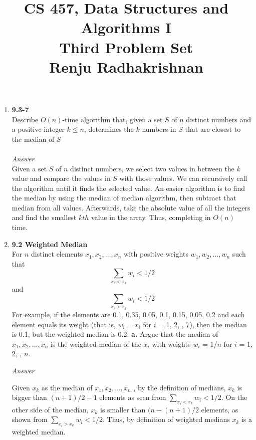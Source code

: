 \documentclass{article}
\begin{document}
\title{CS 457, Data Structures and Algorithms I\\
Third Problem Set\\
Renju Radhakrishnan}
\maketitle
\begin{center}
\end{center}

\begin{enumerate}
\item \textbf{9.3-7}\\
Describe $O(n)$-time algorithm that, given a set $S$ of $n$ distinct numbers and a positive integer $k\leq n$, determines the $k$ numbers in $S$ that are closest to the median of $S$ \\ \\
{\textit{Answer}} \\
Given a set $S$ of $n$ distinct numbers, we select two values in between the $k$ value and compare the values in $S$ with those values. We can recursively call the algorithm until it finds the selected value. An easier algorithm is to find the median by using the median of median algorithm, then subtract that median from all values. Afterwards, take the absolute value of all the integers and find the smallest $kth$ value in the array. Thus, completing in $O(n)$ time.
\newpage
\item \textbf{9.2 Weighted Median}\\
For $n$ distinct elements $x_1, x_2, \dotso, x_n$ with positive weights $w_1, w_2, \dotso, w_n$ such that $$\sum_{x_i < x_k} w_i < 1/2$$ and $$\sum_{x_i > x_k} w_i < 1/2$$
For example, if the elements are 0.1, 0.35, 0.05, 0.1, 0.15, 0.05, 0.2 and each element equals its weight (that is, $w_i = x_i$ for $i$ = 1, 2, \dotso, 7), then the median is 0.1, but the weighted median is 0.2.
\subitem \textbf{a.} Argue that the median of $x_1, x_2, \dotso, x_n$ is the weighted median of the $x_i$ with weights $w_i$ = 1/$n$ for $i$ = 1, 2, \dotso, $n$. 

{\textit{Answer}}

Given $x_k$ as the median of $x_1, x_2, \dotso, x_n$ , by the definition of medians, $x_k$ is bigger than $(n + 1)/2 - 1$ elements as seen from $\sum_{x_i < x_k} w_i < 1/2$. On the other side of the median, $x_k$ is smaller than $(n - (n+1)/2$ elements, as shown from $\sum_{x_i > x_k} w_i < 1/2$. Thus, by definition of weighted medians $x_k$ is a weighted median.


\end{enumerate}
\end{document}
